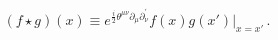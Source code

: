 \begin{equation}
(f\star g) (x)\equiv e^{\frac{i}{2} \theta^{\mu\nu} 
\partial_{\mu}\partial_{\nu}^{\prime}}f(x)g(x')|_{x=x'}\,.\label{eq:3.1}
\end{equation}

